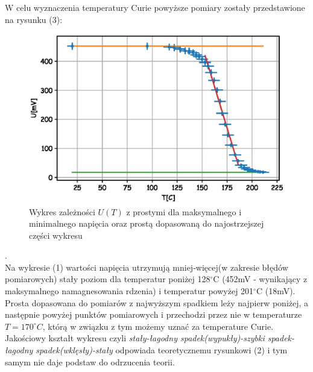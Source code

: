 \documentclass[a4paper,10pt]{article}
\begin{document}
W celu wyznaczenia temperatury Curie powyższe pomiary zostały przedstawione na rysunku (3):
\begin{figure}[H]
  \includegraphics{./Curie_proste.eps}
  \caption{Wykres zależności $U(T)$ z prostymi dla maksymalnego i minimalnego napięcia oraz prostą dopasowaną do najostrzejszej części wykresu}
\end{figure}.
\\Na wykresie (1) wartości napięcia utrzymują mniej-więcej(w zakresie błędów pomiarowych) stały poziom dla temperatur poniżej 128$^\circ$C (452mV - wynikający z maksymalnego namagnesowania rdzenia) i temperatur powyżej 201$^\circ$C (18mV). Prosta dopasowana do pomiarów z najwyższym spadkiem leży najpierw poniżej, a następnie powyżej punktów pomiarowych i przechodzi przez nie w temperaturze $T = 170^\circ C$, którą w związku z tym możemy uznać za temperature Curie. Jakościowy kształt wykresu czyli \emph{stały-łagodny spadek(wypukły)-szybki spadek-łagodny spadek(wklęsły)-stały} odpowiada teoretycznemu rysunkowi (2) i tym samym nie daje podstaw do odrzucenia teorii.
\end{document}
